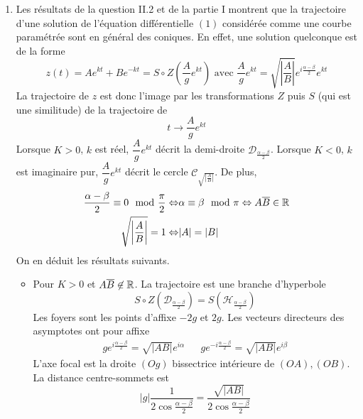 \begin{enumerate}
\item Les résultats de la question II.2 et de la partie I montrent que la trajectoire d'une solution de l'équation différentielle $(1)$ considérée comme une courbe paramétrée sont en général des coniques.\newline
En effet, une solution quelconque est de la forme
\begin{displaymath}
 z(t)=Ae^{kt}+Be^{-kt}= S\circ Z\left( \dfrac{A}{g}e^{kt}\right)\text{ avec }
 \dfrac{A}{g}e^{kt}=\sqrt{\left\vert \dfrac{A}{B}\right\vert}e^{i\frac{\alpha -\beta}{2}}e^{kt}
\end{displaymath}
La trajectoire de $z$ est donc l'image par les transformations $Z$ puis $S$ (qui est une similitude) de la trajectoire de
\begin{displaymath}
 t \rightarrow \dfrac{A}{g}e^{kt}
\end{displaymath}
Lorsque $K>0$, $k$ est réel, $\dfrac{A}{g}e^{kt}$ décrit la demi-droite $\mathcal D_{\frac{\alpha -\beta}{2}}$.\newline
Lorsque $K<0$, $k$ est imaginaire pur, $\dfrac{A}{g}e^{kt}$ décrit le cercle $\mathcal C_{\sqrt{\left\vert \frac{A}{B}\right\vert}}$.\newline
De plus,
\begin{align*}
 \dfrac{\alpha - \beta}{2}\equiv 0 \mod\dfrac{\pi}{2} \Leftrightarrow&
\alpha \equiv \beta \mod \pi \Leftrightarrow A\overline{B}\in \mathbb{R} \\
\sqrt{\left\vert \frac{A}{B}\right\vert}=1 \Leftrightarrow& |A|=|B|
\end{align*}
On en déduit les résultats suivants.

\begin{itemize}

 \item Pour $K>0$ et $A\overline{B}\not\in \mathbb{R}$. La trajectoire est une branche d'hyperbole
\begin{displaymath}
 S\circ Z\left( \mathcal D_{\frac{\alpha -\beta}{2}}\right)=S\left( \mathcal H_{\frac{\alpha -\beta}{2}}\right)  
\end{displaymath}
Les foyers sont les points d'affixe $-2g$ et $2g$. Les vecteurs directeurs des asymptotes ont pour affixe
\begin{align*}
 ge^{i\frac{\alpha -\beta}{2}}=\sqrt{|AB|}e^{i\alpha} & &
 ge^{-i\frac{\alpha -\beta}{2}}=\sqrt{|AB|}e^{i\beta}
\end{align*}
L'axe focal est la droite $(Og)$ bissectrice intérieure de $(OA),(OB)$. La distance centre-sommets est
\begin{displaymath}
 |g|\frac{1}{2\cos\frac{\alpha -\beta}{2}}=\dfrac{\sqrt{|AB|}}{2\cos\frac{\alpha - \beta}{2}}
\end{displaymath}


\end{itemize}
\end{enumerate}

